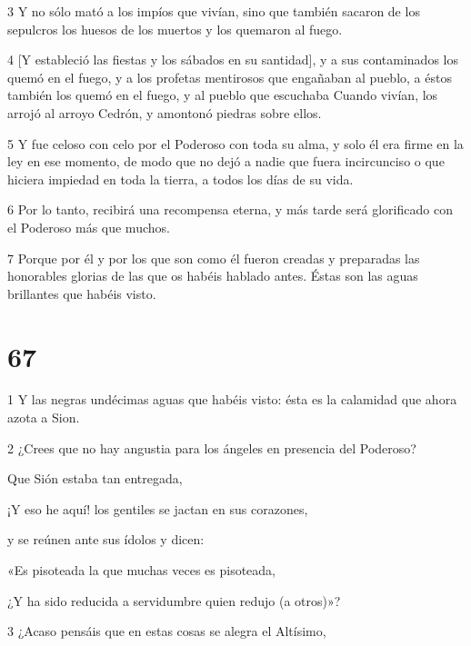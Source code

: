 \par 3 Y no sólo mató a los impíos que vivían, sino que también sacaron de los sepulcros los huesos de los muertos y los quemaron al fuego.

\par 4 [Y estableció las fiestas y los sábados en su santidad], y a sus contaminados los quemó en el fuego, y a los profetas mentirosos que engañaban al pueblo, a éstos también los quemó en el fuego, y al pueblo que escuchaba Cuando vivían, los arrojó al arroyo Cedrón, y amontonó piedras sobre ellos.

\par 5 Y fue celoso con celo por el Poderoso con toda su alma, y ​​solo él era firme en la ley en ese momento, de modo que no dejó a nadie que fuera incircunciso o que hiciera impiedad en toda la tierra, a todos los días de su vida.

\par 6 Por lo tanto, recibirá una recompensa eterna, y más tarde será glorificado con el Poderoso más que muchos.

\par 7 Porque por él y por los que son como él fueron creadas y preparadas las honorables glorias de las que os habéis hablado antes. Éstas son las aguas brillantes que habéis visto.

\chapter{67}

\par 1 Y las negras undécimas aguas que habéis visto: ésta es la calamidad que ahora azota a Sion.

\par 2 ¿Crees que no hay angustia para los ángeles en presencia del Poderoso?

\par Que Sión estaba tan entregada,

\par ¡Y eso he aquí! los gentiles se jactan en sus corazones,

\par y se reúnen ante sus ídolos y dicen:

\par «Es pisoteada la que muchas veces es pisoteada,

\par ¿Y ha sido reducida a servidumbre quien redujo (a otros)»?

\par 3 ¿Acaso pensáis que en estas cosas se alegra el Altísimo,

